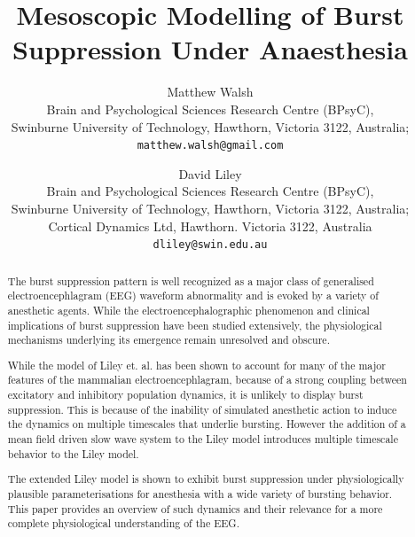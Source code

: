 \documentclass[a4paper,12pt]{article}
\begin{document}
\title{Mesoscopic Modelling of Burst Suppression Under Anaesthesia}
\author{Matthew Walsh\\
   \small Brain and Psychological Sciences Research Centre (BPsyC),\\
   \small Swinburne University of Technology, Hawthorn, Victoria 3122, Australia; \\
   \texttt{matthew.walsh@gmail.com}\\
  \and
    David Liley\\
   \small  Brain and Psychological Sciences Research Centre (BPsyC),\\
   \small Swinburne University of Technology, Hawthorn, Victoria 3122, Australia; \\
   \small Cortical Dynamics Ltd, Hawthorn. Victoria 3122, Australia\\
   \texttt{dliley@swin.edu.au}}
\maketitle

\begin{abstract}
The burst suppression pattern is well recognized as
a major class of generalised electroencephlagram (EEG) waveform abnormality 
and is evoked by a variety of anesthetic agents. 
While the electroencephalographic phenomenon and clinical
implications of burst suppression have been studied extensively, the physiological mechanisms
underlying its emergence remain unresolved and obscure. 

While the model of Liley et. al. has been shown to account for many of the major features of the 
mammalian electroencephlagram, because of a strong coupling between excitatory and inhibitory population dynamics,  
it is unlikely to display burst suppression. This is because of the inability of simulated anesthetic action 
to induce the dynamics on multiple timescales that underlie bursting.
However the addition of a mean field driven slow wave system to the Liley model introduces 
multiple timescale behavior to the Liley model.

The extended Liley model is shown to exhibit burst suppression under physiologically 
plausible parameterisations for anesthesia with a wide variety of bursting behavior. 
This paper provides an overview of such dynamics and their relevance for a more 
complete physiological understanding of the EEG.

\end{abstract}
\end{document}
